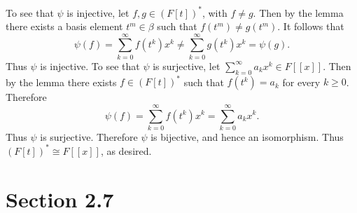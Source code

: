 \documentclass[12pt]{article}
\begin{document}
To see that $\psi$ is injective, let $f, g \in (F[t])^\ast$, with $f \neq g$. Then by the lemma there exists a basis element $t^m \in \beta$ such that $f(t^m) \neq g(t^m)$. It follows that
\begin{equation*}
\psi(f) = \sum_{k=0}^\infty f(t^k) x^k \neq \sum_{k=0}^\infty g(t^k) x^k = \psi(g).
\end{equation*}
Thus $\psi$ is injective. To see that $\psi$ is surjective, let $\sum_{k=0}^\infty a_k x^k \in F[[x]]$. Then by the lemma there exists $f \in (F[t])^\ast$ such that $f(t^k) = a_k$ for every $k \geq 0$. Therefore
\begin{equation*}
\psi(f) = \sum_{k=0}^\infty f(t^k) x^k = \sum_{k=0}^\infty a_k x^k.
\end{equation*}
Thus $\psi$ is surjective. Therefore $\psi$ is bijective, and hence an isomorphism. Thus $(F[t])^\ast \cong F[[x]]$, as desired.

\section*{Section 2.7}
\end{document}
